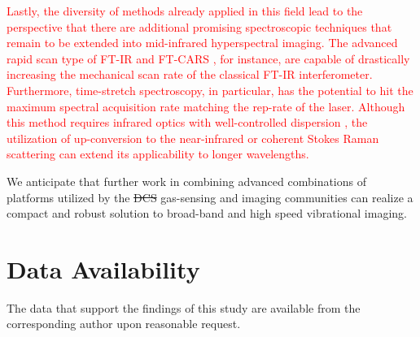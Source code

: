 \documentclass[aip,preprint]{revtex4-1}
\begin{document}
\textcolor{red}{Lastly, the diversity of methods already applied in this field lead to the perspective that there are additional promising spectroscopic techniques that remain to be extended into mid-infrared hyperspectral imaging. The advanced rapid scan type of FT-IR \cite{hashimotoHighSpeedFourier2021} and FT-CARS \cite{hashimotoUltrabroadbandRapidscanFouriertransform2018}, for instance, are capable of drastically increasing the mechanical scan rate of the classical FT-IR interferometer. Furthermore, time-stretch spectroscopy, in particular, has the potential to hit the maximum spectral acquisition rate matching the rep-rate of the laser. Although this method requires infrared optics with well-controlled dispersion \cite{kawaiCompressiveDualcombSpectroscopy2021}, the utilization of up-conversion to the near-infrared \cite{wenBroadbandConversionMid2024,yagiMidinfraredOpticalCoherence2024} or coherent Stokes Raman scattering \cite{nakamuraBroadbandCoherentRaman2023} can extend its applicability to longer wavelengths.}

We anticipate that further work in combining advanced combinations of platforms utilized by the \sout{DCS} gas-sensing and imaging communities can realize a compact and robust solution to broad-band and high speed vibrational imaging. 

\section{Data Availability}
The data that support the findings of this study are available from the corresponding author upon reasonable request.



%
%
\end{document}
